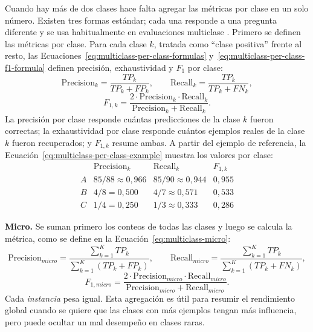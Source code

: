 \documentclass[12pt,oneside]{report}
\begin{document}
Cuando hay más de dos clases hace falta agregar las métricas por clase
en un solo número. Existen tres formas estándar; cada una responde a una
pregunta diferente y se usa habitualmente en evaluaciones multiclase \cite{sokolova_lapalme_2009}. Primero se definen las métricas por clase. Para cada clase $k$, tratada como ``clase positiva'' frente al resto, las Ecuaciones~\eqref{eq:multiclass-per-class-formulas} y~\eqref{eq:multiclass-per-class-f1-formula} definen precisión, exhaustividad y $F_1$ por clase:
\begin{equation}
\label{eq:multiclass-per-class-formulas}
\mathrm{Precision}_k=\frac{TP_k}{TP_k+FP_k},\qquad
\mathrm{Recall}_k=\frac{TP_k}{TP_k+FN_k},
\end{equation}
\begin{equation}
\label{eq:multiclass-per-class-f1-formula}
F_{1,k}=\frac{2\cdot \mathrm{Precision}_k\cdot \mathrm{Recall}_k}{\mathrm{Precision}_k+\mathrm{Recall}_k}.
\end{equation}
La precisión por clase responde cuántas predicciones de la clase $k$ fueron correctas; la exhaustividad por clase responde cuántos ejemplos reales de la clase $k$ fueron recuperados; y $F_{1,k}$ resume ambas. A partir del ejemplo de referencia, la Ecuación~\eqref{eq:multiclass-per-class-example} muestra los valores por clase:
\begin{equation}
\label{eq:multiclass-per-class-example}
\begin{array}{l|ccc}
 & \mathrm{Precision}_k & \mathrm{Recall}_k & F_{1,k} \\
\hline
A & 85/88\approx 0{,}966 & 85/90\approx 0{,}944 & 0{,}955 \\
B & 4/8 = 0{,}500        & 4/7 \approx 0{,}571  & 0{,}533 \\
C & 1/4 = 0{,}250        & 1/3 \approx 0{,}333  & 0{,}286
\end{array}
\end{equation}

\textbf{Micro.} Se suman primero los conteos de todas las clases y luego
se calcula la métrica, como se define en la Ecuación~\eqref{eq:multiclass-micro}:
\begin{equation}
\label{eq:multiclass-micro}
\mathrm{Precision}_{micro}=\frac{\sum_{k=1}^{K} TP_k}{\sum_{k=1}^{K}(TP_k+FP_k)},\qquad
\mathrm{Recall}_{micro}=\frac{\sum_{k=1}^{K} TP_k}{\sum_{k=1}^{K}(TP_k+FN_k)},
\end{equation}
\begin{equation}
\label{eq:multiclass-f1-micro}
F_{1,micro}=\frac{2\cdot \mathrm{Precision}_{micro}\cdot \mathrm{Recall}_{micro}}{\mathrm{Precision}_{micro}+\mathrm{Recall}_{micro}}.
\end{equation}
Cada \emph{instancia} pesa igual. Esta agregación es útil para resumir el rendimiento global cuando se quiere que las clases con más ejemplos tengan más influencia, pero puede ocultar un mal desempeño en clases raras.
\end{document}
